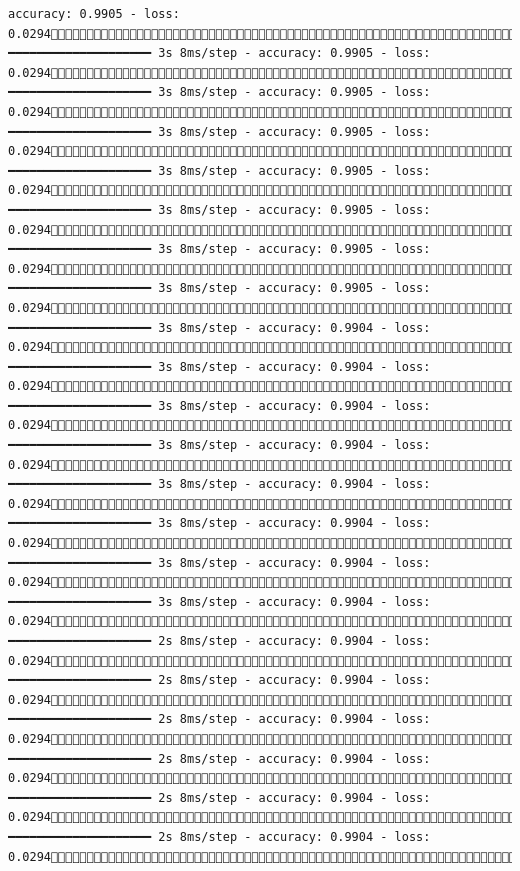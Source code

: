 \documentclass[
  letterpaper,
  DIV=11,
  numbers=noendperiod]{scrreprt}
\begin{document}
\begin{verbatim}
accuracy: 0.9905 - loss: 0.02941386/1875 ━━━━━━━━━━━━━━━━━━━━ 3s 8ms/step - accuracy: 0.9905 - loss: 0.02941393/1875 ━━━━━━━━━━━━━━━━━━━━ 3s 8ms/step - accuracy: 0.9905 - loss: 0.02941400/1875 ━━━━━━━━━━━━━━━━━━━━ 3s 8ms/step - accuracy: 0.9905 - loss: 0.02941407/1875 ━━━━━━━━━━━━━━━━━━━━ 3s 8ms/step - accuracy: 0.9905 - loss: 0.02941413/1875 ━━━━━━━━━━━━━━━━━━━━ 3s 8ms/step - accuracy: 0.9905 - loss: 0.02941420/1875 ━━━━━━━━━━━━━━━━━━━━ 3s 8ms/step - accuracy: 0.9905 - loss: 0.02941426/1875 ━━━━━━━━━━━━━━━━━━━━ 3s 8ms/step - accuracy: 0.9905 - loss: 0.02941432/1875 ━━━━━━━━━━━━━━━━━━━━ 3s 8ms/step - accuracy: 0.9904 - loss: 0.02941439/1875 ━━━━━━━━━━━━━━━━━━━━ 3s 8ms/step - accuracy: 0.9904 - loss: 0.02941446/1875 ━━━━━━━━━━━━━━━━━━━━ 3s 8ms/step - accuracy: 0.9904 - loss: 0.02941453/1875 ━━━━━━━━━━━━━━━━━━━━ 3s 8ms/step - accuracy: 0.9904 - loss: 0.02941460/1875 ━━━━━━━━━━━━━━━━━━━━ 3s 8ms/step - accuracy: 0.9904 - loss: 0.02941466/1875 ━━━━━━━━━━━━━━━━━━━━ 3s 8ms/step - accuracy: 0.9904 - loss: 0.02941473/1875 ━━━━━━━━━━━━━━━━━━━━ 3s 8ms/step - accuracy: 0.9904 - loss: 0.02941479/1875 ━━━━━━━━━━━━━━━━━━━━ 3s 8ms/step - accuracy: 0.9904 - loss: 0.02941486/1875 ━━━━━━━━━━━━━━━━━━━━ 2s 8ms/step - accuracy: 0.9904 - loss: 0.02941493/1875 ━━━━━━━━━━━━━━━━━━━━ 2s 8ms/step - accuracy: 0.9904 - loss: 0.02941500/1875 ━━━━━━━━━━━━━━━━━━━━ 2s 8ms/step - accuracy: 0.9904 - loss: 0.02941507/1875 ━━━━━━━━━━━━━━━━━━━━ 2s 8ms/step - accuracy: 0.9904 - loss: 0.02941514/1875 ━━━━━━━━━━━━━━━━━━━━ 2s 8ms/step - accuracy: 0.9904 - loss: 0.02941520/1875 ━━━━━━━━━━━━━━━━━━━━ 2s 8ms/step - accuracy: 0.9904 - loss: 0.02941526/1875 
\end{verbatim}
\end{document}
